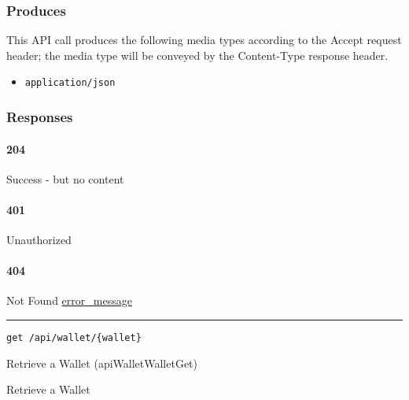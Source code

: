 \hypertarget{produces-16}{%
\subsubsection{Produces}\label{produces-16}}

This API call produces the following media types according to the
{Accept} request header; the media type will be conveyed by the
{Content-Type} response header.

\begin{itemize}
\tightlist
\item
  \texttt{application/json}
\end{itemize}

\hypertarget{responses-16}{%
\subsubsection{Responses}\label{responses-16}}

\hypertarget{section-53}{%
\paragraph{204}\label{section-53}}

Success - but no content \protect\hyperlink{}{}

\hypertarget{section-54}{%
\paragraph{401}\label{section-54}}

Unauthorized \protect\hyperlink{}{}

\hypertarget{section-55}{%
\paragraph{404}\label{section-55}}

Not Found \protect\hyperlink{error_message}{error\_message}

\begin{center}\rule{0.5\linewidth}{\linethickness}\end{center}

\protect\hypertarget{apiWalletWalletGet}{}{}

\begin{verbatim}
get /api/wallet/{wallet}
\end{verbatim}

Retrieve a Wallet ({apiWalletWalletGet})

Retrieve a Wallet

